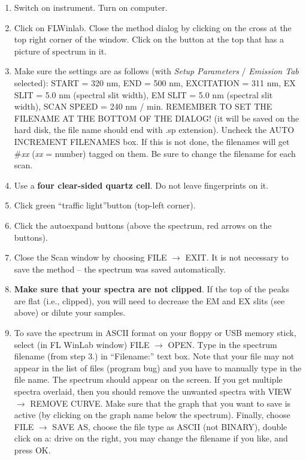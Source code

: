 \documentclass[byrevtex,amssymb,aps,pra,floatfix,letterpaper]{revtex4}
\begin{document}
\begin{enumerate}
\item Switch on instrument. Turn on computer.

\item Click on FLWinlab. Close the method dialog by clicking on the cross at the top right corner of the window. Click on the button at the top that has a picture of spectrum in it.

\item Make sure the settings are as follows (with \textit{Setup Parameters} / \textit{Emission Tab} selected): START = 320 nm, END = 500 nm, EXCITATION = 311 nm, EX SLIT = 5.0 nm (spectral slit width), EM SLIT = 5.0 nm (spectral slit width), SCAN SPEED = 240 nm / min. REMEMBER TO SET THE FILENAME AT THE BOTTOM OF THE DIALOG! (it will be saved on the hard disk, the file name should end with .sp extension). Uncheck the AUTO INCREMENT FILENAMES box. If this is not done, the
filenames will get \#\textit{xx} (\textit{xx} = number) tagged on them. Be sure to change the filename for each scan.

\item Use a \textbf{four clear-sided quartz cell}. Do not leave fingerprints on it.

\item Click green ``traffic light''button (top-left corner).

\item Click the autoexpand buttons (above the spectrum, red arrows on the buttons).

\item Close the Scan window by choosing FILE $\rightarrow$ EXIT. It is not necessary to save the method -- the spectrum was saved automatically.

\item \textbf{Make sure that your spectra are not clipped}. If the top of the peaks are flat (i.e., clipped), 
you will need to decrease the EM and EX slits (see above) or dilute your samples.

\item To save the spectrum in ASCII format on your floppy or USB memory stick, select (in FL WinLab window) FILE $\rightarrow$ OPEN. Type in the spectrum filename (from step 3.) in ``Filename:'' text box. Note that your file may not appear in the list of files (program bug) and you have to manually type in the file name. The spectrum should appear on the screen. If you get multiple spectra overlaid, then you should remove the unwanted spectra with VIEW $\rightarrow$ REMOVE CURVE. Make sure that the graph that you want to save is active (by clicking on the graph name below the spectrum). Finally, choose FILE $\rightarrow$ SAVE AS, choose the file type as ASCII (not BINARY), double click on a: drive on the right, you may change the filename if you like, and press OK.

\end{enumerate}
\end{document}
